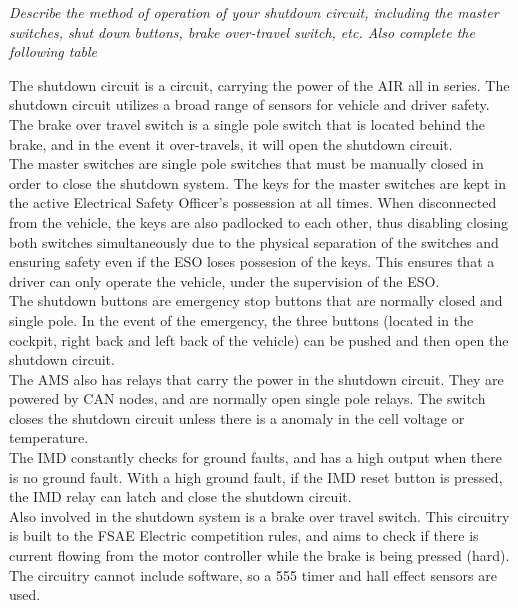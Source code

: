 \documentclass{article}
\begin{document}
\textit{Describe the method of operation of your shutdown circuit, including the master switches, shut down buttons, brake over-travel switch, etc. Also complete the following table}

The shutdown circuit is a circuit, carrying the power of the AIR all in series. The shutdown circuit utilizes a broad range of sensors for vehicle and driver safety.
The brake over travel switch is a single pole switch that is located behind the brake, and in the event it over-travels, it will open the shutdown circuit.\\

The master switches are single pole switches that must be manually closed in order to close the shutdown system. The keys for the master switches are kept in the active Electrical Safety Officer's possession at all times. When disconnected from the vehicle, the keys are also padlocked to each other, thus disabling closing both switches simultaneously due to the physical separation of the switches and ensuring safety even if the ESO loses possesion of the keys. This ensures that a driver can only operate the vehicle, under the supervision of the ESO.\\

The shutdown buttons are emergency stop buttons that are normally closed and single pole. In the event of the emergency, the three buttons (located in the cockpit, right back and left back of the vehicle) can be pushed and then open the shutdown circuit.\\

The AMS also has relays that carry the power in the shutdown circuit. They are powered by CAN nodes, and are normally open single pole relays. The switch closes the shutdown circuit unless there is a anomaly in the cell voltage or temperature.\\

The IMD constantly checks for ground faults, and has a high output when there is no ground fault. With a high ground fault, if the IMD reset button is pressed, the IMD relay can latch and close the shutdown circuit. \\

Also involved in the shutdown system is a brake over travel switch. This circuitry is built to the FSAE Electric competition rules, and aims to check if there is current flowing from the motor controller while the brake is being pressed (hard). The circuitry cannot include software, so a 555 timer and hall effect sensors are used.\\
\end{document}
